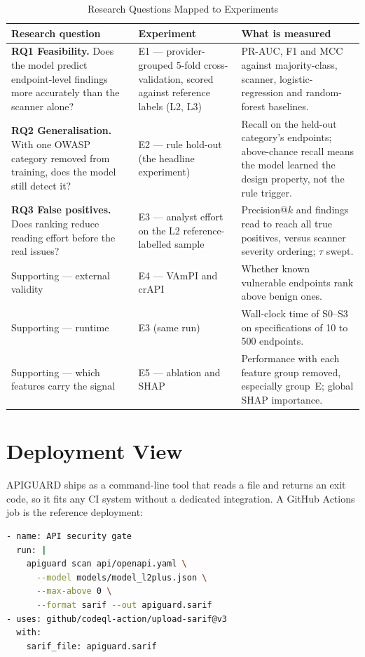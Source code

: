 \documentclass[conference]{IEEEtran}
\begin{document}
\begin{table}[!t]
\caption{Research Questions Mapped to Experiments}
\label{tab:validation}
\centering
\scriptsize
\begin{tabularx}{\columnwidth}{L{2.05cm} L{1.75cm} Y}
\toprule
\textbf{Research question} & \textbf{Experiment} & \textbf{What is measured}\\
\midrule
\textbf{RQ1 Feasibility.} Does the model predict endpoint-level findings more accurately than
the scanner alone? & E1 --- provider-grouped 5-fold cross-validation, scored against reference labels (L2, L3) & PR-AUC, F1
and MCC against majority-class, scanner, logistic-regression and random-forest baselines.\\[2pt]
\textbf{RQ2 Generalisation.} With one OWASP category removed from training, does the model
still detect it? & E2 --- rule hold-out (the headline experiment) & Recall on the held-out
category's endpoints; above-chance recall means the model learned the design property, not the
rule trigger.\\[2pt]
\textbf{RQ3 False positives.} Does ranking reduce reading effort before the real issues? & E3
--- analyst effort on the L2 reference-labelled sample & Precision@$k$ and findings read to reach
all true positives, versus scanner severity ordering; $\tau$ swept.\\[2pt]
Supporting --- external validity & E4 --- VAmPI and crAPI & Whether known vulnerable endpoints
rank above benign ones.\\[2pt]
Supporting --- runtime & E3 (same run) & Wall-clock time of S0--S3 on specifications of 10 to 500
endpoints.\\[2pt]
Supporting --- which features carry the signal & E5 --- ablation and SHAP & Performance with
each feature group removed, especially group~E; global SHAP importance.\\
\bottomrule
\end{tabularx}
\end{table}

\section{Deployment View}
APIGUARD ships as a command-line tool that reads a file and returns an exit code, so it fits
any CI system without a dedicated integration. A GitHub Actions job is the reference
deployment:

\begin{lstlisting}[language=bash]
- name: API security gate
  run: |
    apiguard scan api/openapi.yaml \
      --model models/model_l2plus.json \
      --max-above 0 \
      --format sarif --out apiguard.sarif
- uses: github/codeql-action/upload-sarif@v3
  with:
    sarif_file: apiguard.sarif
\end{lstlisting}
\end{document}

